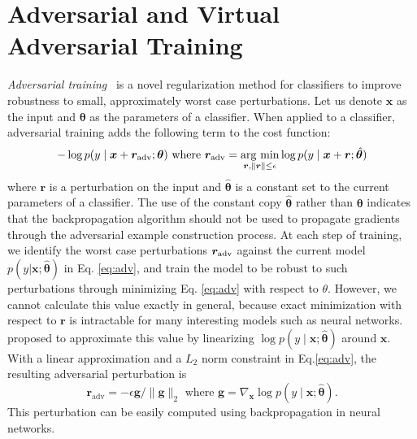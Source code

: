 \documentclass{article}
\newcommand{\vx}{{\bm{x}}}
\newcommand{\vg}{{\bm{g}}}
\newcommand{\vr}{\bm{r}}
\newcommand{\vtheta}{\bm{\theta}}
\newcommand{\argmin}{\mathop{\rm arg~min}\limits}
\begin{document}
\section{\label{sec:adv_vadv}Adversarial and Virtual Adversarial Training}
\label{sec:adv}
\emph{Adversarial training}~\cite[]{goodfellow2014explaining} is a novel regularization
method for classifiers to improve robustness to small, approximately
worst case perturbations.
Let us denote $\vx$ as the input and $\vtheta$ as the parameters of a classifier.
When applied to a classifier, adversarial training adds the following term to
the cost function:
\begin{gather}	
	-\log p(y \mid \vx+\vr_{\rm adv}; \vtheta)  
       \  {\rm where}\  \vr_{\rm adv} = \argmin_{\vr, \|\vr\| \leq \epsilon} \log
p(y \mid \vx+\vr; \hat{\vtheta}) \label{eq:adv}
\end{gather}
where $\vr$ is a perturbation on the input and $\hat{\vtheta}$ is a constant
set to the current parameters of a classifier.
The use of the constant copy $\hat{\vtheta}$ rather than $\vtheta$ indicates that
the backpropagation algorithm should not be used to propagate gradients through
the adversarial example construction process.
At each step of training, we identify the worst case perturbations $\vr_{\rm adv}$
against the current model $p(y|\vx; \hat{\vtheta})$ in Eq. \eqref{eq:adv}, and train the model to be
robust to such perturbations through minimizing Eq. \eqref{eq:adv} with respect to $\theta$.  
However, we cannot calculate this value exactly in general, because
exact minimization with respect to $\vr$ is intractable for many interesting
models such as neural networks.
\citet{goodfellow2014explaining} proposed to approximate
this value by linearizing $\log p(y \mid \vx; \hat{\vtheta})$ around $\vx$.
With a linear approximation and a
$L_2$ norm constraint in Eq.\eqref{eq:adv}, the resulting adversarial perturbation
is
\[
\vr_{\mathrm{adv}} =
- \epsilon {\vg} / {\| \vg \|_2} \text{ where }
\vg = \nabla_\vx \log p(y \mid \vx; \hat{\vtheta}).
\]
This perturbation can be easily computed using backpropagation in neural networks.
\end{document}
